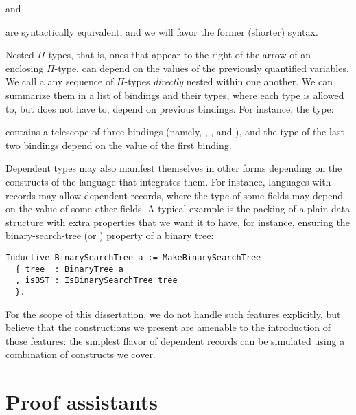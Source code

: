 \noindent
and

\noindent
{}

\noindent
are syntactically equivalent, and we will favor the former (shorter) syntax.


Nested $\Pi$-types, that is, ones that appear to the right of the arrow of an
enclosing $\Pi$-type, can depend on the values of the previously quantified
variables.  We call a  any sequence of $\Pi$-types
\emph{directly} nested within one another.  We can summarize them in a list of
bindings and their types, where each type is allowed to, but does not have to,
depend on previous bindings.  For instance, the type:

\noindent
{}

\noindent
contains a telescope of three bindings (namely, , ,
and ), and the type of the last two bindings depend on the value of
the first binding.

Dependent types may also manifest themselves in other forms depending on the
constructs of the language that integrates them.  For instance, languages with
records may allow dependent records, where the type of some fields may depend on
the value of some other fields.  A typical example is the packing of a plain
data structure with extra properties that we want it to have, for instance,
ensuring the binary-search-tree (or ) property of a binary tree:

\begin{verbatim}
Inductive BinarySearchTree a := MakeBinarySearchTree
  { tree  : BinaryTree a
  , isBST : IsBinarySearchTree tree
  }.
\end{verbatim}

For the scope of this dissertation, we do not handle such features explicitly,
but believe that the constructions we present are amenable to the introduction
of those features: the simplest flavor of dependent records can be simulated
using a combination of constructs we cover.

\section{Proof assistants}\label{proof-assistants}

